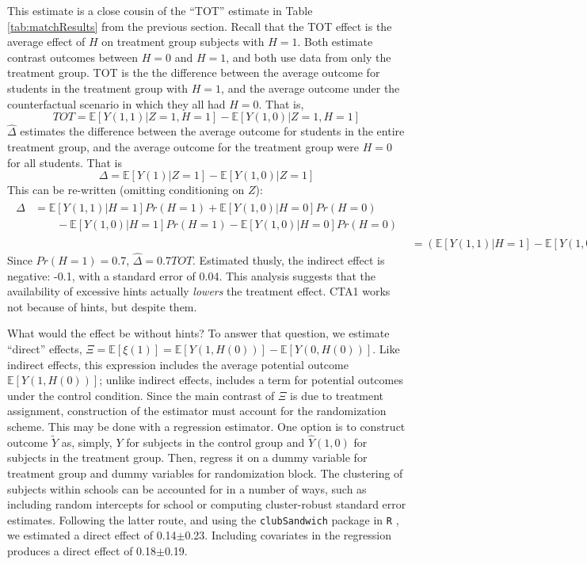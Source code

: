 \documentclass{article}\usepackage[]{graphicx}\usepackage[]{color}
\newcommand{\EE}{\mathbb{E}}
\begin{document}
This estimate is a close cousin of the ``TOT'' estimate in Table
\ref{tab:matchResults} from the previous section.
Recall that the TOT effect is the average effect of $H$ on treatment
group subjects with $H=1$.
Both estimate contrast outcomes between $H=0$ and $H=1$, and both use
data from only the treatment group.
TOT is the the difference between the average outcome for students in
the treatment group with $H=1$, and the average outcome under the
counterfactual scenario in which they all had $H=0$.
That is,
\begin{equation*}
TOT=\EE[Y(1,1)|Z=1,H=1]-\EE[Y(1,0)|Z=1,H=1]
\end{equation*}
$\hat{\Delta}$ estimates the difference between the average outcome
for students in the entire treatment group, and the average outcome
for the treatment group were $H=0$ for all students.
That is
\begin{equation*}
\Delta=\EE[Y(1)|Z=1]-\EE[Y(1,0)|Z=1]
\end{equation*}
This can be re-written (omitting conditioning on $Z$):
\begin{align*}
\begin{split}
\Delta&=\EE[Y(1,1)|H=1]Pr(H=1)+\EE[Y(1,0)|H=0]Pr(H=0)\\
&\qquad -\EE[Y(1,0)|H=1]Pr(H=1)-\EE[Y(1,0)|H=0]Pr(H=0)
\end{split}
\\[2ex]
&=(\EE[Y(1,1)|H=1]-\EE[Y(1,0)|H=1])Pr(H=1)
\end{align*}
Since $Pr(H=1)=$0.7,
$\hat{\Delta}=$0.7$TOT$.
Estimated thusly, the indirect effect is negative: -0.1, with
a standard error of 0.04.
This analysis suggests that the availability of excessive hints
actually \emph{lowers} the treatment effect.
CTA1 works not because of hints, but despite them.

What would the effect be without hints?
To answer that question, we estimate ``direct'' effects,
$\Xi=\EE[\xi(1)]=\EE[Y(1,H(0))]-\EE[Y(0,H(0))]$.
Like indirect effects, this expression includes the average potential
outcome $\EE[Y(1,H(0))]$; unlike indirect effects, includes a term for
potential outcomes under the control condition.
Since the main contrast of $\Xi$ is due to treatment assignment,
construction of the estimator must account for the randomization
scheme.
This may be done with a regression estimator.
One option is to construct outcome $\tilde{Y}$ as, simply, $Y$ for
subjects in the control group and $\hat{Y}(1,0)$ for subjects in the
treatment group.
Then, regress it on a dummy variable for treatment group and dummy
variables for randomization block.
The clustering of subjects within schools can be accounted for in a
number of ways, such as including random intercepts for school or
computing cluster-robust standard error estimates.
Following the latter route, and using the \texttt{clubSandwich}
package in \texttt{R} \citep{clubsandwich}, we estimated a direct
effect of
0.14$\pm$0.23.
Including covariates in the regression produces a direct effect of
0.18$\pm$0.19.
\end{document}
